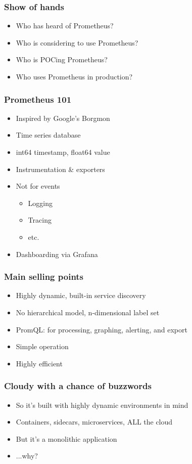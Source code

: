 \documentclass[t]{beamer}
\begin{document}


\begin{frame}
	\frametitle{Show of hands}
	\begin{itemize}
		\item Who has heard of Prometheus?
		\item Who is considering to use Prometheus?
		\item Who is POCing Prometheus?
		\item Who uses Prometheus in production?
	\end{itemize}
\end{frame}

\begin{frame}
	\frametitle{Prometheus 101}
	\begin{itemize}
		\item Inspired by Google's Borgmon
		\item Time series database
		\item int64 timestamp, float64 value
		\item Instrumentation \& exporters
		\item Not for events
		\begin{itemize}
			\item Logging
			\item Tracing
			\item etc.
		\end{itemize}
		\item Dashboarding via Grafana
	\end{itemize}
\end{frame}

\begin{frame}
	\frametitle{Main selling points}
	\begin{itemize}
		\item Highly dynamic, built-in service discovery
		\item No hierarchical model, n-dimensional label set
		\item PromQL: for processing, graphing, alerting, and export
		\item Simple operation
		\item Highly efficient
	\end{itemize}
\end{frame}

\begin{frame}
	\frametitle{Cloudy with a chance of buzzwords}
	\begin{itemize}
		\item So it's built with highly dynamic environments in mind
		\item Containers, sidecars, microservices, ALL the cloud
		\item But it's a monolithic application
		\vfill
		\item ...why?
	\end{itemize}
\end{frame}
\end{document}
